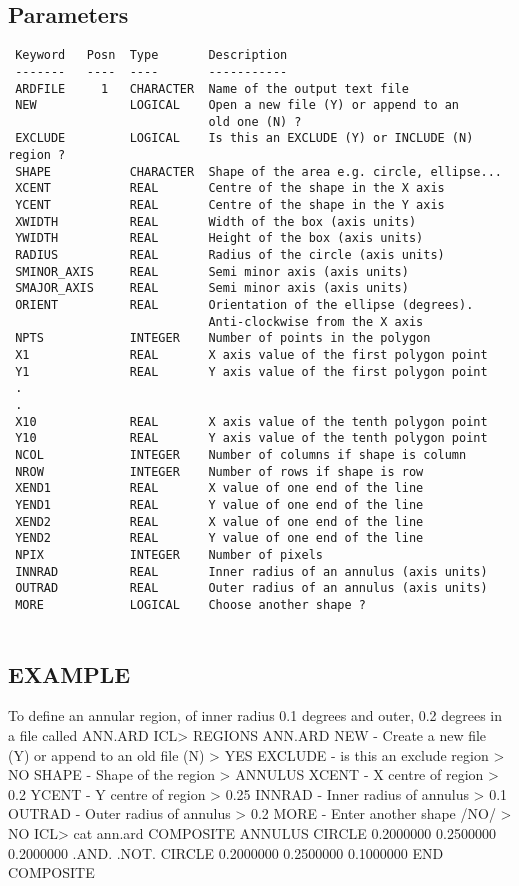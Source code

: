 \documentclass{book}
\renewcommand{\_}{{\tt\char'137}}     %
\begin{document}
\subsection{Parameters}
\begin{verbatim}
 Keyword   Posn  Type       Description
 -------   ----  ----       -----------
 ARDFILE     1   CHARACTER  Name of the output text file
 NEW             LOGICAL    Open a new file (Y) or append to an
                            old one (N) ?
 EXCLUDE         LOGICAL    Is this an EXCLUDE (Y) or INCLUDE (N) region ?
 SHAPE           CHARACTER  Shape of the area e.g. circle, ellipse...
 XCENT           REAL       Centre of the shape in the X axis
 YCENT           REAL       Centre of the shape in the Y axis
 XWIDTH          REAL       Width of the box (axis units)
 YWIDTH          REAL       Height of the box (axis units)
 RADIUS          REAL       Radius of the circle (axis units)
 SMINOR_AXIS     REAL       Semi minor axis (axis units)
 SMAJOR_AXIS     REAL       Semi minor axis (axis units)
 ORIENT          REAL       Orientation of the ellipse (degrees).
                            Anti-clockwise from the X axis
 NPTS            INTEGER    Number of points in the polygon
 X1              REAL       X axis value of the first polygon point
 Y1              REAL       Y axis value of the first polygon point
 .
 .
 X10             REAL       X axis value of the tenth polygon point
 Y10             REAL       Y axis value of the tenth polygon point
 NCOL            INTEGER    Number of columns if shape is column
 NROW            INTEGER    Number of rows if shape is row
 XEND1           REAL       X value of one end of the line
 YEND1           REAL       Y value of one end of the line
 XEND2           REAL       X value of one end of the line
 YEND2           REAL       Y value of one end of the line
 NPIX            INTEGER    Number of pixels
 INNRAD          REAL       Inner radius of an annulus (axis units)
 OUTRAD          REAL       Outer radius of an annulus (axis units)
 MORE            LOGICAL    Choose another shape ?
 
\end{verbatim}\subsection{EXAMPLE}
To define an annular region, of inner radius 0.1 degrees and outer,
0.2 degrees in a file called ANN.ARD
ICL> REGIONS ANN.ARD
NEW - Create a new file (Y) or append to an old file (N) > YES
EXCLUDE - is this an exclude region > NO
SHAPE - Shape of the region > ANNULUS
XCENT - X centre of region > 0.2
YCENT - Y centre of region > 0.25
INNRAD - Inner radius of annulus > 0.1
OUTRAD - Outer radius of annulus > 0.2
MORE - Enter another shape /NO/ > NO
ICL> cat ann.ard
COMPOSITE ANNULUS
CIRCLE 0.2000000 0.2500000 0.2000000
.AND. .NOT. CIRCLE 0.2000000 0.2500000 0.1000000
END COMPOSITE
\end{document}
